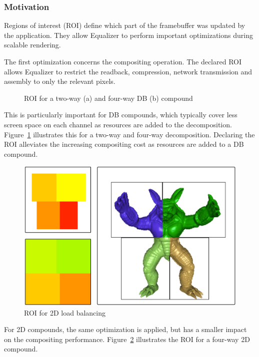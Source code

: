 \documentclass[10pt,a4]{scrartcl}
\newcommand{\fig}[1]{Figure~\ref{#1}}
\begin{document}
\subsubsection{Motivation}
Regions of interest (ROI) define which part of the framebuffer was updated by
the application. They allow Equalizer to perform important optimizations during
scalable rendering.

The first optimization concerns the compositing operation. The declared ROI
allows Equalizer to restrict the readback, compression, network transmission and
assembly to only the relevant pixels. 

\begin{figure}
  \hfil
  {\caption{\label{fROIDB}ROI for a two-way (a) and four-way DB (b) compound}}
\end{figure}
This is particularly important for DB compounds, which typically cover less
screen space on each channel as resources are added to the
decomposition. \fig{fROIDB} illustrates this for a two-way and four-way
decomposition. Declaring the ROI alleviates the increasing compositing cost as
resources are added to a DB compound. 

\begin{figure}
  \includegraphics[width=.382\textwidth]{images/roi}
  {\caption{\label{fROI}ROI for 2D load balancing}}
\end{figure}
For 2D compounds, the same optimization is applied, but has a smaller impact on
the compositing performance. \fig{fROI} illustrates the ROI for a four-way 2D
compound.
\end{document}
